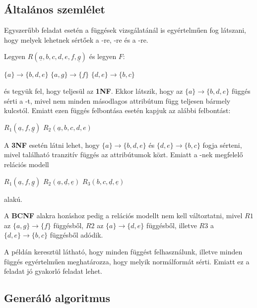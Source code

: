 \subsection{Általános szemlélet}
Egyszerűbb feladat esetén a függések vizsgálatánál is egyértelműen fog látszani, hogy melyek lehetnek sértőek a \nfk-re, \nfh-re és a \BCNF-re.
\begin{pld}
    Legyen $R(\underline{a},b,c,d,e,f,\underline{g})$ és legyen $F$:
    \begin{center}
        $\{a\} \longrightarrow \{b,d,e\}$ \break
        $\{a,g\} \longrightarrow \{f\}$ \break
        $\{d,e\} \longrightarrow \{b,c\}$ \break
    \end{center}
    és tegyük fel, hogy teljesül az \textbf{1NF}. Ekkor látszik, hogy az $\{a\} \rightarrow \{b,d,e\}$ függés sérti a \nfk-t, mivel nem minden másodlagos attribútum függ teljesen bármely kulcstól. Emiatt ezen függés felbontása esetén kapjuk az alábbi felbontást:
    \begin{center}
        $R_1(\underline{a},f,\underline{g})$ \break
        $R_2(\underline{a},b,c,d,e)$
    \end{center}
    A \textbf{3NF} esetén látni lehet, hogy $\{a\} \rightarrow \{b,d,e\}$ és $\{d,e\} \rightarrow \{b,c\}$ fogja sérteni, mivel található tranzitív függés az attribútumok közt. Emiatt a \nfh-nek megfelelő relációs modell
    \begin{center}
        $R_1(\underline{a},f,\underline{g})$ \break
        $R_2(\underline{a},\underline{d},\underline{e})$ \break
        $R_3(b,c,\underline{d},\underline{e})$
    \end{center}
    alakú. \par
    A \textbf{BCNF} alakra hozáshoz pedig a relációs modellt nem kell változtatni, mivel $R1$ az $\{a,g\} \rightarrow \{f\}$ függésből, $R2$ az $\{a\} \rightarrow \{d,e\}$ függésből, illetve $R3$ a $\{d,e\} \rightarrow \{b,c\}$ függésből adódik.
\end{pld}
A példán keresztül látható, hogy minden függést felhasználunk, illetve minden függés egyértelműen meghatározza, hogy melyik normálformát sérti. Emiatt ez a feladat jó gyakorló feladat lehet.

\subsection{Generáló algoritmus}

